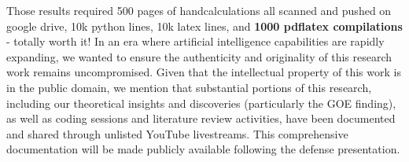\documentclass[a4paper]{article}
\theoremstyle{plain}
\theoremstyle{definition}
\theoremstyle{remark}
\begin{document}
Those results required 500 pages of handcalculations all scanned and pushed on google drive, 10k python lines, 10k latex lines,  and  \textbf{1000 pdflatex compilations} - totally worth it!
In an era where artificial intelligence capabilities are rapidly expanding, we wanted to ensure the authenticity and 
originality of this research work remains uncompromised. Given that the intellectual property of this work is 
in the public domain, we mention that substantial portions of this research, including our theoretical insights 
and discoveries (particularly the GOE finding), as well as coding sessions and literature review activities, have 
been documented and shared through unlisted YouTube livestreams. This comprehensive documentation will be made 
publicly available following the defense presentation.
\end{document}
